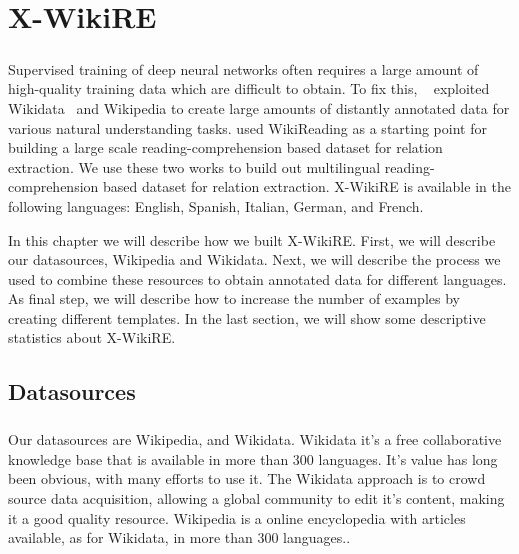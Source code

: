 \chapter{X-WikiRE}
\label{chpt:4}
\paragraph{}
Supervised training of deep neural networks often requires a large amount of high-quality training data which are difficult to obtain.  To fix this, ~\cite{hewlett2016wikireading} exploited Wikidata~\cite{vwikidata} and Wikipedia to create large amounts of distantly annotated data for various natural understanding tasks. \cite{levy2017zero} used WikiReading as a starting point for building a large scale reading-comprehension based dataset for relation extraction. We use these two works to build out multilingual reading-comprehension based dataset for relation extraction. X-WikiRE is available in the following languages: English, Spanish, Italian, German, and French.

In this chapter we will describe how we built X-WikiRE. First,  we will describe our datasources, Wikipedia and Wikidata. Next, we will describe the process we used to combine these resources to obtain annotated data for different languages. As final step, we will describe how to increase the number of examples by creating different templates. In the last section, we will show some descriptive statistics about X-WikiRE.


\section{Datasources}
\paragraph{}
Our datasources are Wikipedia, and Wikidata. Wikidata it's a free collaborative knowledge base that is available in more than 300 languages. It's value has long been obvious, with many efforts to use it. The Wikidata approach is to crowd source data acquisition, allowing a global community to edit it's content, making it a good quality resource.  Wikipedia is a online encyclopedia with articles available, as for Wikidata, in more than 300 languages..  %

